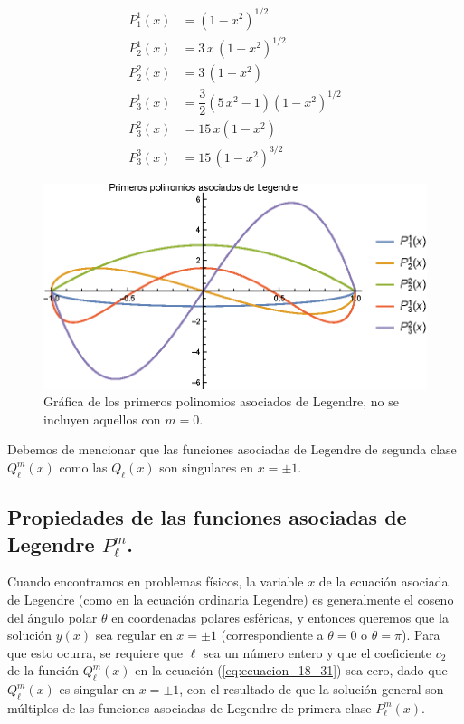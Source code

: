 \begin{align*}
P_{1}^{1} (x) &= (1 - x^{2})^{1/2} \\[0.5em]
P_{2}^{1} (x) &= 3 \, x \, (1 - x^{2})^{1/2} \\[0.5em]
P_{2}^{2} (x) &= 3 \, (1 - x^{2}) \\[0.5em]
P_{3}^{1} (x) &= \dfrac{3}{2}(5 \, x^{2} - 1)(1 - x^{2})^{1/2} \\[0.5em]
P_{3}^{2} (x) &= 15 \, x (1 - x^{2}) \\[0.5em]
P_{3}^{3} (x) &= 15 \, (1 - x^{2})^{3/2}
\end{align*}
\begin{figure}[H]
    \centering
    \includegraphics[scale=1.2]{Imagenes/Plot_Asociados_Lagrange.eps}
    \caption{Gráfica de los primeros polinomios asociados de Legendre, no se incluyen aquellos con $m = 0$.}
    \label{fig:figura_asociados_Legedre}
\end{figure}
Debemos de mencionar que las funciones asociadas de Legendre de segunda clase $Q_{\ell}^{m} (x)$ como las $Q_{\ell}(x)$ son singulares en $x = \pm 1$.

\subsection{Propiedades de las funciones asociadas de Legendre \texorpdfstring{$P_{\ell}^{m}$}{Plm}.}

Cuando encontramos en problemas físicos, la variable $x$ de la ecuación asociada de Legendre (como en la ecuación ordinaria Legendre) es generalmente el coseno del ángulo polar $\theta$ en coordenadas polares esféricas, y entonces queremos que la solución $y (x)$ sea regular en $x = \pm 1$ (correspondiente a $\theta = 0$ o $\theta = \pi$). Para que esto ocurra, se requiere que $\ell$ sea un número entero y que el coeficiente $c_{2}$ de la función $Q_{\ell}^{m} (x)$ en la ecuación (\ref{eq:ecuacion_18_31}) sea cero, dado que $Q_{\ell}^{m}(x)$ es singular en $x = \pm 1$, con el resultado de que la solución general son múltiplos de las funciones asociadas de Legendre de primera clase $P_{\ell}^{m}(x)$.

